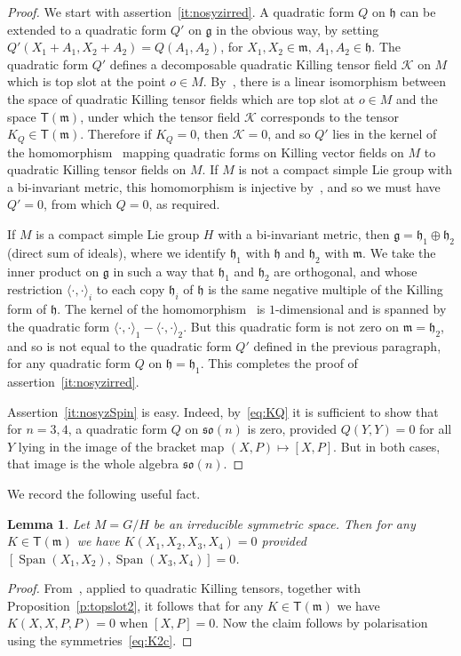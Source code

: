 \documentclass[12pt,reqno]{amsart}
\newcommand \Span{\operatorname{Span}}
\newcommand \cK{\mathcal{K}}
\newcommand \sT{\mathsf{T}}
\newcommand\g{\mathfrak g}
\newcommand\h{\mathfrak h}
\newcommand\m{\mathfrak m}
\newcommand \so{\mathfrak{so}}
\newcommand \<{\langle}
\renewcommand \>{\rangle}
\newcommand \ip{\<\cdot,\cdot\>}
\newtheorem{lemma}{Lemma}
\theoremstyle{definition}
\theoremstyle{remark}
\begin{document}
	\begin{proof} 
		We start with assertion~\eqref{it:nosyzirred}. A quadratic form $Q$ on $\h$ can be extended to a quadratic form $Q'$ on $\g$ in the obvious way, by setting $Q'(X_1+A_1,X_2+A_2) = Q(A_1,A_2)$, for $X_1, X_2 \in \m, \, A_1,A_2 \in \h$. The quadratic form $Q'$ defines a decomposable quadratic Killing tensor field $\cK$ on $M$ which is top slot at the point $o \in M$. By~\cite[Theorem~3]{MN2}, there is a linear isomorphism between the space of quadratic Killing tensor fields which are top slot at $o \in M$ and the space $\sT(\m)$, under which the tensor field $\cK$ corresponds to the tensor $K_Q \in \sT(\m)$. Therefore if $K_Q = 0$, then $\cK = 0$, and so $Q'$ lies in the kernel of the homomorphism~\cite[Equation~(43)]{EL} mapping quadratic forms on Killing vector fields on $M$ to quadratic Killing tensor fields on $M$. If $M$ is not a compact simple Lie group with a bi-invariant metric, this homomorphism is injective by~\cite[Corollary~3]{EL}, and so we must have $Q' = 0$, from which $Q=0$, as required.

If $M$ is  a compact simple Lie group $H$ with a bi-invariant metric, then $\g = \h_1 \oplus \h_2$ (direct sum of ideals), where we identify $\h_1$ with $\h$ and $\h_2$ with $\m$. We take the inner product on $\g$ in such a way that $\h_1$ and $\h_2$ are orthogonal, and whose restriction $\ip_i$ to each copy $\h_i$ of $\h$ is the same negative multiple of the Killing form of $\h$. The kernel of the homomorphism~\cite[Equation~(43)]{EL} is $1$-dimensional and is spanned by the quadratic form $\ip_1 - \ip_2$. But this quadratic form is not zero on $\m = \h_2$, and so is not equal to the quadratic form $Q'$ defined in the previous paragraph, for any quadratic form $Q$ on $\h = \h_1$. This completes the proof of assertion~\eqref{it:nosyzirred}.
	
Assertion~\eqref{it:nosyzSpin} is easy. Indeed, by~\eqref{eq:KQ} it is sufficient to show that for $n=3,4$, a quadratic form $Q$ on $\so(n)$ is zero, provided $Q(Y,Y)=0$ for all $Y$ lying in the image of the bracket map $(X,P) \mapsto [X,P]$. But in both cases, that image is the whole algebra $\so(n)$.
\end{proof}

We record the following useful fact.
	\begin{lemma} \label{l:fourcommute}
		Let $M= G/H$ be an irreducible symmetric space. Then for any $K \in \sT(\m)$ we have $K(X_1,X_2,X_3,X_4) = 0$ provided $[\Span(X_1,X_2),\Span(X_3,X_4)] = 0$.
	\end{lemma}
	\begin{proof}
		From~\cite[Corollary~2]{MN2}, applied to quadratic Killing tensors, together with Proposition~\ref{p:topslot2}, it follows that for any $K \in \sT(\m)$ we have $K(X,X,P,P) = 0$ when $[X, P] = 0$. Now the claim follows by polarisation using the symmetries~\eqref{eq:K2c}.
	\end{proof}
		
\end{document}
